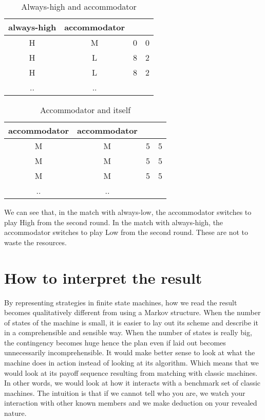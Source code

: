\documentclass[12.5pt]{report}
\begin{document}
\begin{table}[h!]
\center
\begin{tabular}{cc|cc}
always-high & accommodator &  & \\
\hline
H & M & 0 & 0 \\
H & L & 8 & 2 \\
H & L & 8 & 2 \\
.. & ..\\
\end{tabular}
\caption{Always-high and accommodator}
\end{table}

\begin{table}[h!]
\center
\begin{tabular}{cc|cc}
accommodator & accommodator &  & \\
\hline
M & M & 5 & 5 \\
M & M & 5 & 5 \\
M & M & 5 & 5 \\
.. & ..\\
\end{tabular}
\caption{Accommodator and itself}
\end{table}

We can see that, in the match with always-low, the accommodator switches to play High from the second round. In the match with always-high, the accommodator switches to play Low from the second round. These are not to waste the resources.

\section{How to interpret the result}

By representing strategies in finite state machines, how we read the result becomes qualitatively different from using a Markov structure. When the number of states of the machine is small, it is easier to lay out its scheme and describe it in a comprehensible and sensible way. When the number of states is really big, the contingency becomes huge hence the plan even if laid out becomes unnecessarily incomprehensible. It would make better sense to look at what the machine does in action instead of looking at its algorithm. Which means that we would look at its payoff sequence resulting from matching with classic machines. In other words, we would look at how it interacts with a benchmark set of classic machines. The intuition is that if we cannot tell who you are, we watch your interaction with other known members and we make deduction on your revealed nature.\\
\end{document}
